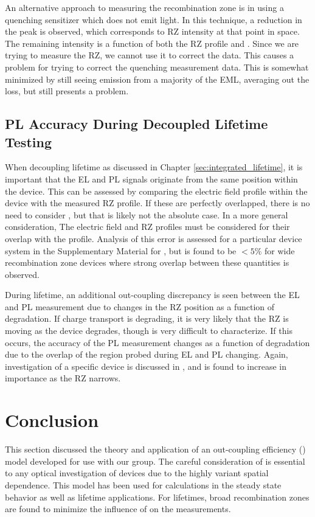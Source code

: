 \documentclass[../thesis.tex]{subfiles}
\begin{document}
An alternative approach to measuring the recombination zone is in using a quenching sensitizer which does not emit light.\supercite{Erickson2014}
In this technique, a reduction in the \irppy peak is observed, which corresponds to RZ intensity at that point in space.
The remaining intensity is a function of both the RZ profile and \oc.
Since we are trying to measure the RZ, we cannot use it to correct the data.
This causes a problem for trying to correct the quenching measurement data.
This is somewhat minimized by still seeing emission from a majority of the EML, averaging out the loss, but still presents a problem.

\subsection{PL Accuracy During Decoupled Lifetime Testing}

When decoupling lifetime as discussed in Chapter \ref{sec:integrated_lifetime}, it is important that the EL and PL signals originate from the same position within the device.
This can be assessed by comparing the electric field profile within the device with the measured RZ profile.\supercite{Bangsund2018}
If these are perfectly overlapped, there is no need to consider \oc, but that is likely not the absolute case.
In a more general consideration, The electric field and RZ profiles must be considered for their overlap with the \oc profile.
Analysis of this error is assessed for a particular device system in the Supplementary Material for \textcite{Bangsund2018}, but is found to be $<5\%$ for wide recombination zone devices where strong overlap between these quantities is observed.

During lifetime, an additional out-coupling discrepancy is seen between the EL and PL measurement due to changes in the RZ position as a function of degradation.
If charge transport is degrading, it is very likely that the RZ is moving as the device degrades, though is very difficult to characterize.
If this occurs, the accuracy of the PL measurement changes as a function of degradation due to the overlap of the region probed during EL and PL changing.
Again, investigation of a specific device is discussed in \textcite{Bangsund2018}, and is found to increase in importance as the RZ narrows.


\section{Conclusion}

This section discussed the theory and application of an out-coupling efficiency (\oc) model developed for use with our group.
The careful consideration of \oc is essential to any optical investigation of devices due to the highly variant spatial dependence.
This model has been used for calculations in the steady state behavior as well as lifetime applications.
For lifetimes, broad recombination zones are found to minimize the influence of \oc on the measurements.





\end{document}
